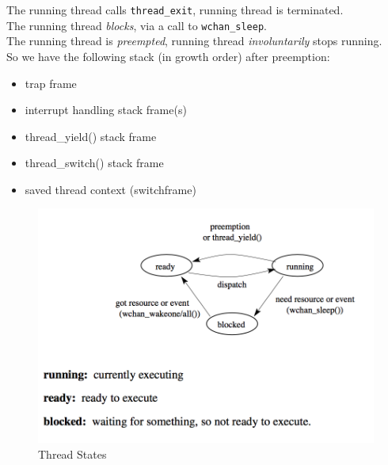 \documentclass[12pt]{article}
\theoremstyle{plain}
\theoremstyle{definition}
\begin{document}
The running thread calls \texttt{thread\_exit}, running thread is terminated. \\

The running thread \emph{blocks}, via a call to \texttt{wchan\_sleep}. \\

The running thread is \emph{preempted}, running thread \emph{involuntarily} stops running. \\
So we have the following stack (in growth order) after preemption:
\begin{itemize}
  \item trap frame
  \item interrupt handling stack frame(s)
  \item thread\_yield() stack frame
  \item thread\_switch() stack frame
  \item saved thread context (switchframe)
\end{itemize}

\begin{figure}[H]
  \centering
  \includegraphics[scale=0.6]{pictures/thread_states.png}
  \caption{Thread States}
  \label{fig:thread_states}
\end{figure}
\end{document}
